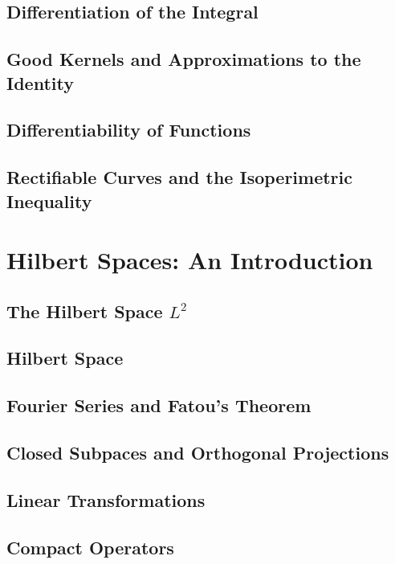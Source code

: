 \documentclass[12pt, a4paper, openany, twoside]{book}
\theoremstyle{definition}
\theoremstyle{remark}
\theoremstyle{plain}
\numberwithin{equation}{section}
\begin{document}
\section{Differentiation of the Integral}
\section{Good Kernels and Approximations to the Identity}
\section{Differentiability of Functions}
\section{Rectifiable Curves and the Isoperimetric Inequality}

\newpage
\chapter{Hilbert Spaces: An Introduction}
\section{The Hilbert Space $L^2$}
\section{Hilbert Space}
\section{Fourier Series and Fatou's Theorem}
\section{Closed Subpaces and Orthogonal Projections}
\section{Linear Transformations}
\section{Compact Operators}

\newpage
\end{document}
